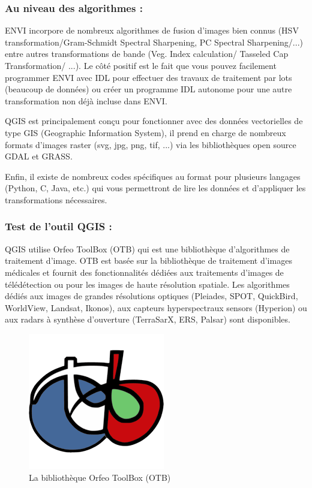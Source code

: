 \documentclass[12pt, openany]{report}
\begin{document}
\subsubsection{Au niveau des algorithmes :}


ENVI incorpore de nombreux algorithmes de fusion d'images bien connus (HSV transformation/Gram-Schmidt Spectral Sharpening, PC Spectral Sharpening/...) entre autres transformations de bande (Veg. Index calculation/ Tasseled Cap Transformation/ ...). Le côté positif est le fait que vous pouvez facilement programmer ENVI avec IDL pour effectuer des travaux de traitement par lots (beaucoup de données) ou créer un programme IDL autonome pour une autre transformation non déjà incluse dans ENVI.

QGIS est principalement conçu pour fonctionner avec des données vectorielles de type GIS (Geographic Information System), il prend en charge de nombreux formats d'images raster (svg, jpg, png, tif, ...) via les bibliothèques open source GDAL et GRASS.

Enfin, il existe de nombreux codes spécifiques au format pour plusieurs langages (Python, C, Java, etc.) qui vous permettront de lire les données et d'appliquer les transformations nécessaires.

\subsubsection{Test de l'outil QGIS :}
QGIS utilise Orfeo ToolBox (OTB) qui est une bibliothèque d’algorithmes de traitement d’image. OTB est basée sur la bibliothèque de traitement d’images médicales et fournit des fonctionnalités dédiées aux traitements d’images de télédétection ou pour les images de haute résolution spatiale. Les algorithmes dédiés aux images de grandes résolutions optiques (Pleiades, SPOT, QuickBird, WorldView, Landsat, Ikonos), aux capteurs hyperspectraux sensors (Hyperion) ou aux radars à synthèse d’ouverture (TerraSarX, ERS, Palsar) sont disponibles.
\begin{figure}[H]
\centering
\includegraphics[scale=0.5]{orfeo.png}
\caption{La bibliothèque Orfeo ToolBox (OTB)}
\end{figure}
\end{document}
